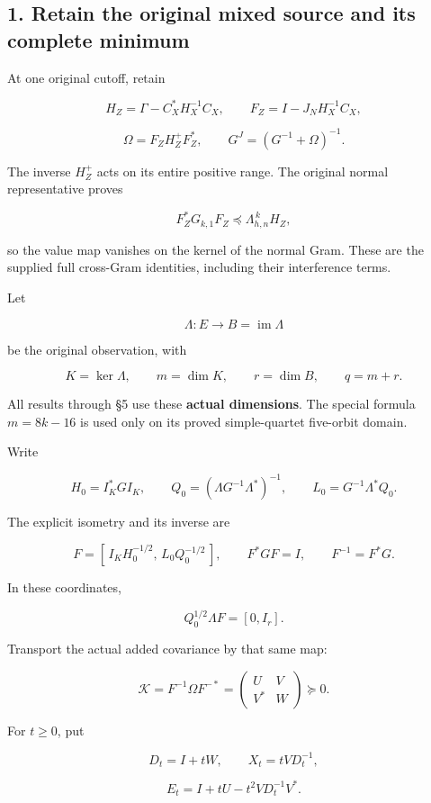\subsection{1. Retain the original mixed source and its complete minimum}\label{retain-the-original-mixed-source-and-its-complete-minimum}

At one original cutoff, retain

\[
H_Z=\Gamma-C_X^*H_X^{-1}C_X,\qquad
F_Z=I-J_NH_X^{-1}C_X,
\]

\[
\Omega=F_ZH_Z^+F_Z^*,\qquad
G^J=(G^{-1}+\Omega)^{-1}.
\]

The inverse \(H_Z^+\) acts on its entire positive range. The original normal representative proves

\[
F_Z^*G_{k,1}F_Z\preceq \Lambda_{h,n}^{\,k}H_Z,
\]

so the value map vanishes on the kernel of the normal Gram. These are the supplied full cross-Gram identities, including their interference terms.

Let

\[
\Lambda:E\longrightarrow B=\operatorname{im}\Lambda
\]

be the original observation, with

\[
K=\ker\Lambda,\qquad m=\dim K,\qquad r=\dim B,\qquad q=m+r.
\]

All results through §5 use these \textbf{actual dimensions}. The special formula \(m=8k-16\) is used only on its proved simple-quartet five-orbit domain.

Write

\[
H_0=I_K^*GI_K,\qquad
Q_0=(\Lambda G^{-1}\Lambda^*)^{-1},\qquad
L_0=G^{-1}\Lambda^*Q_0.
\]

The explicit isometry and its inverse are

\[
F=[\,I_KH_0^{-1/2},\,L_0Q_0^{-1/2}\,],
\qquad
F^*GF=I,\qquad F^{-1}=F^*G.
\tag{3}
\]

In these coordinates,

\[
Q_0^{1/2}\Lambda F=[0,I_r].
\]

Transport the actual added covariance by that same map:

\[
\mathcal K=F^{-1}\Omega F^{-*}
=
\begin{pmatrix}
U&V\\V^*&W
\end{pmatrix}\succeq0.
\tag{4}
\]

For \(t\ge0\), put

\[
D_t=I+tW,\qquad
X_t=tVD_t^{-1},
\]

\[
E_t=I+tU-t^2VD_t^{-1}V^*.
\tag{5}
\]


